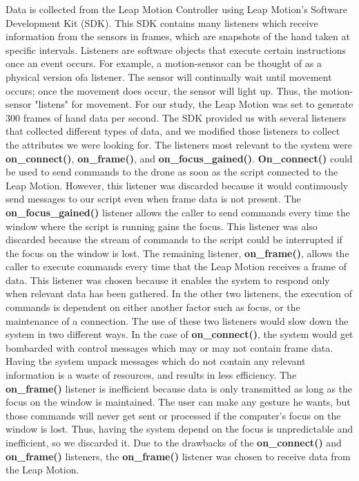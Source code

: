 \documentclass[letterpaper,english, 12pt]{article}
\begin{document}
Data is collected from the Leap Motion Controller using Leap Motion's Software Development Kit (SDK). This SDK contains many listeners which receive information from the sensors in frames, which are snapshots of the hand taken at specific intervals. Listeners are software objects that execute certain instructions once an event occurs. For example, a motion-sensor can be thought of as a physical version ofa listener. The sensor will continually wait until movement occurs; once the movement does occur, the sensor will light up. Thus, the motion-sensor "listens" for movement. For our study, the Leap Motion was set to generate 300 frames of hand data per second. The SDK provided us with several listeners that collected different types of data, and we modified those listeners to collect the attributes we were looking for. The listeners most relevant to the system were  \textbf{on\_connect()}, \textbf{on\_frame()}, and \textbf{on\_focus\_gained()}. \textbf{On\_connect()} could be used to send commands to the drone as soon as the script connected to the Leap Motion. However, this listener was discarded because it would continuously send messages to our script even when frame data is not present. The \textbf{on\_focus\_gained()} listener allows the caller to send commands every time the window where the script is running gains the focus. This listener was also discarded because the stream of commands to the script could be interrupted if the focus on the window is lost. The remaining listener, \textbf{on\_frame()}, allows the caller to execute commands every time that the Leap Motion receives a frame of data. This listener was chosen because it enables the system to respond only when relevant data has been gathered. In the other two listeners,  the execution of commands is dependent on either another factor such as focus, or the maintenance of a connection. The use of these two listeners would slow down the system in two different ways. In the case of \textbf{on\_connect()}, the system would get bombarded with control messages which may or may not contain frame data. Having the system unpack messages which do not contain any relevant information is a waste of resources, and results in less efficiency. The \textbf{on\_frame()} listener is inefficient because data is only transmitted as long as the focus on the window is maintained. The user can make any gesture he wants, but those commands will never get sent or processed if the computer's focus on the window is lost. Thus, having the system depend on the focus is unpredictable and inefficient, so we discarded it. Due to the drawbacks of the \textbf{on\_connect()} and \textbf{on\_frame()} listeners, the \textbf{on\_frame()} listener was chosen to receive data from the Leap Motion.
\end{document}
